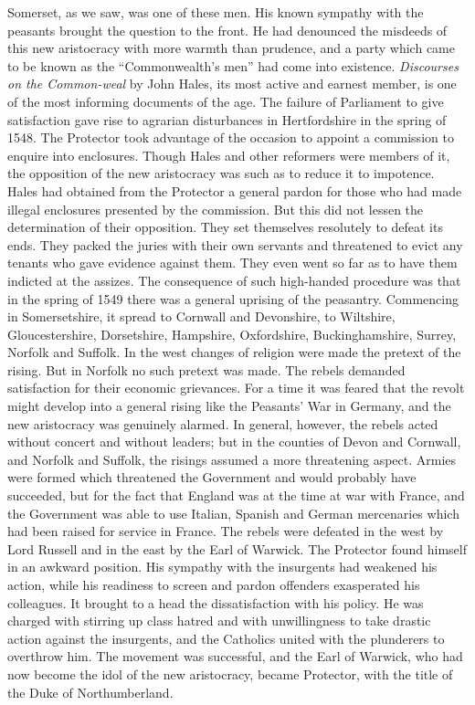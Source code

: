 \documentclass{book}
\begin{document}
Somerset, as we saw, was one of these men. His known sympathy with the peasants brought the question to the front. He had denounced the misdeeds of this new aristocracy with more warmth than prudence, and a party which came to be known as the “Commonwealth’s men” had come into existence. \emph{Discourses on the Common-weal} by John Hales, its most active and earnest member, is one of the most informing documents of the age. The failure of Parliament to give satisfaction gave rise to agrarian disturbances in Hertfordshire in the spring of 1548. The Protector took advantage of the occasion to appoint a commission to enquire into enclosures. Though Hales and other reformers were members of it, the opposition of the new aristocracy was such as to reduce it to impotence. Hales had obtained from the Protector a general pardon for those who had made illegal enclosures presented by the commission. But this did not lessen the determination of their opposition. They set themselves resolutely to defeat its ends. They packed the juries with their own servants and threatened to evict any tenants who gave evidence against them. They even went so far as to have them indicted at the assizes. The consequence of such high-handed procedure was that in the spring of 1549 there was a general uprising of the peasantry. Commencing in Somersetshire, it spread to Cornwall and Devonshire, to Wiltshire, Gloucestershire, Dorsetshire, Hampshire, Oxfordshire, Buckinghamshire, Surrey, Norfolk and Suffolk. In the west changes of religion were made the pretext of the rising. But in Norfolk no such pretext was made. The rebels demanded satisfaction for their economic grievances. For a time it was feared that the revolt might develop into a general rising like the Peasants’ War in Germany, and the new aristocracy was genuinely alarmed. In general, however, the rebels acted without concert and without leaders; but in the counties of Devon and Cornwall, and Norfolk and Suffolk, the risings assumed a more threatening aspect. Armies were formed which threatened the Government and would probably have succeeded, but for the fact that England was at the time at war with France, and the Government was able to use Italian, Spanish and German mercenaries which had been raised for service in France. The rebels were defeated in the west by Lord Russell and in the east by the Earl of Warwick. The Protector found himself in an awkward position. His sympathy with the insurgents had weakened his action, while his readiness to screen and pardon offenders exasperated his colleagues. It brought to a head the dissatisfaction with his policy. He was charged with stirring up class hatred and with unwillingness to take drastic action against the insurgents, and the Catholics united with the plunderers to overthrow him. The movement was successful, and the Earl of Warwick, who had now become the idol of the new aristocracy, became Protector, with the title of the Duke of Northumberland.
\end{document}
